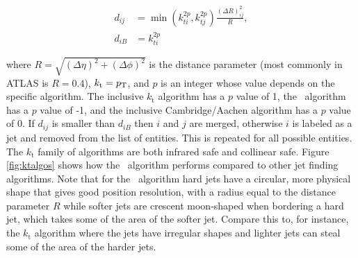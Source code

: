 \begin{align}
	d_{ij} &= \min (k_{ti}^{2p}, k_{tj}^{2p}) \frac{(\Delta R)^2_{ij}}{R}, \\
	d_{iB} &= k_{ti}^{2p}
\end{align}

where $R=\sqrt{(\Delta \eta)^2 + (\Delta \phi)^2}$ is the distance parameter (most commonly in ATLAS is $R=0.4$), $k_{\rm{t}} = p_{\mathrm{T}}$, and $p$ is an integer whose value depends on the specific algorithm.  The inclusive $k_{\mathrm{t}}$ algorithm has a $p$ value of 1, the \antikt\ algorithm has a $p$ value of -1, and the inclusive Cambridge/Aachen algorithm has a $p$ value of 0.  If $d_{ij}$ is smaller than $d_{iB}$ then $i$ and $j$ are merged, otherwise $i$ is labeled as a jet and removed from the list of entities.  This is repeated for all possible entities. \\

The $k_{\mathrm{t}}$ family of algorithms are both infrared safe and collinear safe.  Figure \ref{fig:ktalgos} shows how the \antikt\ algorithm performs compared to other jet finding algorithms.  Note that for the \antikt\ algorithm hard jets have a circular, more physical shape that gives good position resolution, with a radius equal to the distance parameter $R$ while softer jets are crescent moon-shaped when bordering a hard jet, which takes some of the area of the softer jet.  Compare this to, for instance, the $k_{\mathrm{t}}$ algorithm where the jets have irregular shapes and lighter jets can steal some of the area of the harder jets. \\


